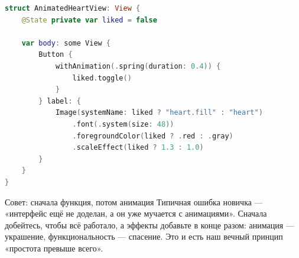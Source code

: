 \begin{lstlisting}[language=Swift]
struct AnimatedHeartView: View {
    @State private var liked = false

    var body: some View {
        Button {
            withAnimation(.spring(duration: 0.4)) {
                liked.toggle()
            }
        } label: {
            Image(systemName: liked ? "heart.fill" : "heart")
                .font(.system(size: 48))
                .foregroundColor(liked ? .red : .gray)
                .scaleEffect(liked ? 1.3 : 1.0)
        }
    }
}
\end{lstlisting}

\begin{tcbinfo}{Совет: сначала функция, потом анимация}
Типичная ошибка новичка — «интерфейс ещё не доделан, а он уже мучается с анимациями». Сначала добейтесь, чтобы всё работало, а эффекты добавьте в конце разом: анимация — украшение, функциональность — спасение. Это и есть наш вечный принцип «простота превыше всего».

\end{tcbinfo}

